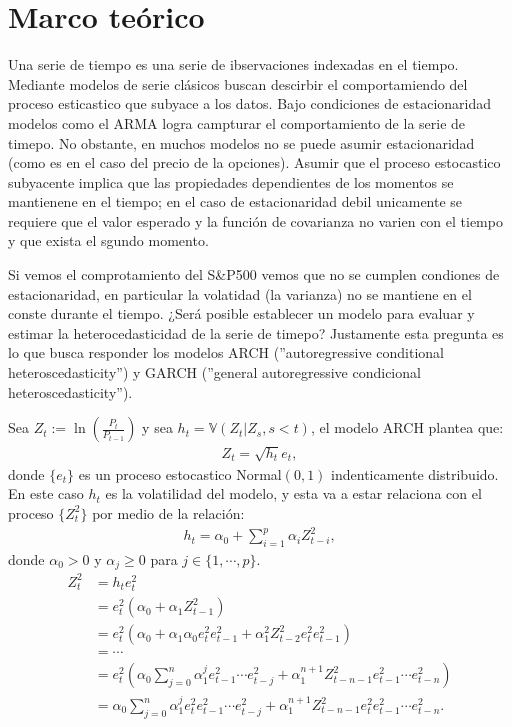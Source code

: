 \section{Marco teórico}

Una serie de tiempo es una serie de ibservaciones indexadas en el tiempo. Mediante modelos de serie clásicos buscan descirbir el comportamiendo del proceso esticastico que subyace a los datos. Bajo condiciones de estacionaridad modelos como el ARMA logra campturar el comportamiento de la serie de timepo. No obstante, en muchos modelos no se puede asumir estacionaridad (como es en el caso del precio de la opciones). Asumir que el proceso estocastico subyacente implica que las propiedades dependientes de los momentos se mantienene en el tiempo; en el caso de estacionaridad debil unicamente se requiere que el valor esperado y la función de covarianza no varien con el tiempo y que exista el sgundo momento.
\newline

Si vemos el comprotamiento del S\&P500 vemos que no se cumplen condiones de estacionaridad, en particular la volatidad (la varianza) no se mantiene en el conste durante el tiempo. ¿Será posible establecer un modelo para evaluar y estimar la heterocedasticidad de la serie de timepo? Justamente esta pregunta es lo que busca responder los modelos ARCH (''autoregressive conditional heteroscedasticity'') y GARCH (''general autoregressive condicional heteroscedasticity''). 
\newline 

Sea $Z_t:= \ln\left(\frac{P_t}{P_{t-1}}\right)$ y sea $h_t= \mathbb{V}\left(Z_t|Z_s,s<t\right)$, el modelo ARCH plantea que: 
\begin{align*}
    Z_t = \sqrt{h_t} e_{t},
\end{align*}
donde $\{e_t\}$ es un proceso estocastico Normal$(0,1)$ indenticamente distribuido. En este caso $h_t$ es la volatilidad del modelo, y esta va a estar relaciona con el proceso $\{Z_t^2\}$ por medio de la relación: 
\begin{align*}
    h_t = \alpha_0 + \sum_{i=1}^{p} \alpha_i Z_{t-i}^2,
\end{align*}
donde $\alpha_0>0$ y $\alpha_j\geq 0$ para $j\in \{1,\cdots,p\}$. 
\begin{align*}
    Z_t^2 &= h_t e_{t}^2\\
    &= e_t^2\left(\alpha_0 + \alpha_1 Z_{t-1}^2\right)\\
    &= e_t^2\left(\alpha_0 +  \alpha_1\alpha_0 e^{2}_{t} e^{2}_{t-1}+ \alpha_1^2 Z_{t-2}^2e^{ 2}_te^{2}_{t-1}\right)\\
    &= \cdots\\
    &= e_t^2\left(\alpha_0 \sum_{j=0}^n \alpha_1^{j}e_{t-1}^2\cdots e_{t-j}^2 +  \alpha_1^{n+1}Z_{t-n-1}^2  e^{2}_{t-1}\cdots e^{2}_{t-n}\right)\\
    &= \alpha_0 \sum_{j=0}^n \alpha_1^{j}e^{2}_t e_{t-1}^2\cdots e_{t-j}^2 +  \alpha_1^{n+1}Z_{t-n-1}^2  e^2_t e^{2}_{t-1}\cdots e^{2}_{t-n}.
\end{align*}


